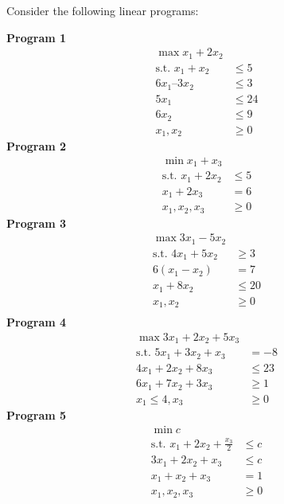 \documentclass[fleqn]{homework}
\begin{document}
  \begin{problem}{2}
    \begin{question}
      Consider the following linear programs:
      \begin{multicols}{3}
      \noindent \textbf{Program 1}
      \begin{align*}
        \max x_1 + 2x_2 & \\
        \text{s.t.  } x_1 + x_2 &\le 5 \\
        6x_1 – 3x_2 &\le3 \\
        5x_1 &\le 24 \\
        6x_2 &\le 9 \\
        x_1, x_2 &\ge 0
      \end{align*}
      \textbf{Program 2}
      \begin{align*}
        \min x_1 + x_3 & \\
        \text{s.t.  } x_1 + 2x_2 &\le 5 \\
        x_1 + 2x_3 &= 6 \\
        x_1, x_2, x_3 &\ge 0
      \end{align*}
      \textbf{Program 3}
      \begin{align*}
        \max 3x_1 - 5x_2 & \\
        \text{s.t.  } 4x_1 + 5x_2 &\ge 3 \\
        6(x_1 - x_2) &= 7 \\
        x_1 + 8x_2 &\le 20 \\
        x_1, x_2 &\ge 0 \\
      \end{align*}
      \textbf{Program 4}
      \begin{align*}
        \max 3x_1 + 2x_2 + 5x_3 & \\
        \text{s.t.  } 5x_1 + 3x_2 + x_3 &= -8 \\
        4x_1 + 2x_2+ 8x_3 &\le 23 \\
        6x_1 + 7x_2 + 3x_3 &\ge 1 \\
        x_1 \le 4, x_3 &\ge 0
      \end{align*}
      \textbf{Program 5}
      \begin{align*}
        \min c & \\
        \text{s.t.  } x_1 + 2x_2 + \frac{x_3}{2} &\le c \\
        3x_1 + 2x_2 + x_3 &\le c \\
        x_1 + x_2 + x_3 &= 1 \\
        x_1, x_2, x_3 &\ge 0
      \end{align*}

\end{multicols}
\end{question}
\end{problem}
\end{document}
